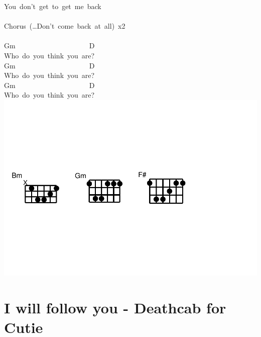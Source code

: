 \documentclass[]{book}
\let\stdsection\section
\renewcommand\section{\clearpage\stdsection}
\begin{document}
You~don't~get~to~get~me~back\\
~\\
Chorus~(\ldots Don't~come~back~at~all)~x2\\
~\\
Gm~~~~~~~~~~~~~~~~~~~~~D\\
Who~do~you~think~you~are?\\
Gm~~~~~~~~~~~~~~~~~~~~~D\\
Who~do~you~think~you~are?\\
Gm~~~~~~~~~~~~~~~~~~~~~D\\
Who~do~you~think~you~are?~\\

\includegraphics{Songs_files/figure-latex/unnamed-chunk-12-1.pdf}

\hypertarget{i-will-follow-you---deathcab-for-cutie}{%
\section{I will follow you - Deathcab for Cutie}\label{i-will-follow-you---deathcab-for-cutie}}
\end{document}
